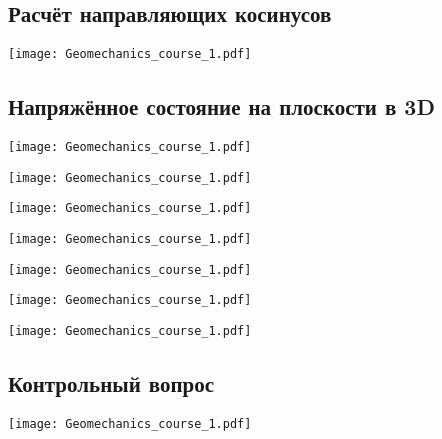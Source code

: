\documentclass[main.tex]{subfiles}
\begin{document}
\subsection{Расчёт направляющих косинусов}

\begin{center}
\texttt{[image: Geomechanics\_course\_1.pdf]}
\end{center}

\subsection{Напряжённое состояние на плоскости в 3D}

\begin{center}
\texttt{[image: Geomechanics\_course\_1.pdf]}
\end{center}

\begin{center}
\texttt{[image: Geomechanics\_course\_1.pdf]}
\end{center}

\begin{center}
\texttt{[image: Geomechanics\_course\_1.pdf]}
\end{center}

\begin{center}
\texttt{[image: Geomechanics\_course\_1.pdf]}
\end{center}

\begin{center}
\texttt{[image: Geomechanics\_course\_1.pdf]}
\end{center}

\begin{center}
\texttt{[image: Geomechanics\_course\_1.pdf]}
\end{center}

\begin{center}
\texttt{[image: Geomechanics\_course\_1.pdf]}
\end{center}

\subsection{Контрольный вопрос}

\begin{center}
\texttt{[image: Geomechanics\_course\_1.pdf]}
\end{center}
\end{document}
